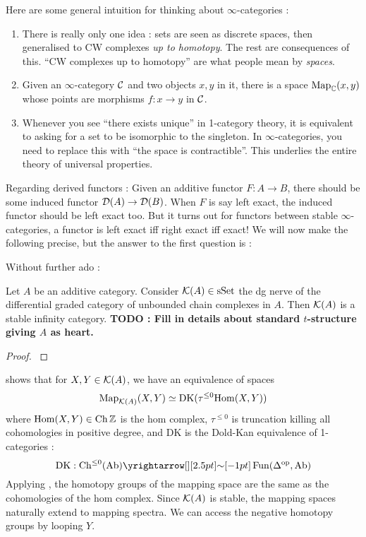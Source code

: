 \documentclass{article}
\begin{document}
Here are some general intuition for thinking about $\infty$-categories : 
\begin{enumerate}
  \item There is really only one idea : 
  sets are seen as discrete spaces,
  then generalised to CW complexes \emph{up to homotopy}.
  The rest are consequences of this.
  ``CW complexes up to homotopy'' are what people
  mean by \emph{spaces}.
  \item Given an $\infty$-category $\mathcal{C}$ and two objects $x , y$ in it,
  there is a space $\mathrm{Map}_{\mathbb{C}}(x , y)$ whose points are morphisms 
  $f : x \to y$ in $\mathcal{C}$.
  \item Whenever you see ``there exists unique'' in 1-category theory,
  it is equivalent to asking for a set to be isomorphic to the singleton.
  In $\infty$-categories, you need to replace
  this with ``the space is contractible''.
  This underlies the entire theory of universal properties.
\end{enumerate}
Regarding derived functors : 
Given an additive functor $F : A \to B$,
there should be some induced functor $\mathcal{D}(A) \to \mathcal{D}(B)$.
When $F$ is say left exact, 
the induced functor should be left exact too.
But it turns out for functors between stable $\infty$-categories,
a functor is left exact iff right exact iff exact!
\cite[Prop. 1.1.4.1]{lurie-HA}
We will now make the following precise, but the answer to the first question is :
\begin{center}
\end{center}
Without further ado :
\begin{prop}

  Let $A$ be an additive category.
  Consider $\mathcal{K}(A) \in \operatorname{sSet}$ 
  the dg nerve of the differential graded
  category of unbounded chain complexes in $A$.
  Then $\mathcal{K}(A)$ is a stable infinity category.
  \textbf{TODO : Fill in details about standard $t$-structure
  giving $A$ as heart.}
\end{prop}
\begin{proof}
  \cite[Prop. 1.3.2.10]{lurie-HA}
\end{proof}
\cite[Remark 1.3.1.12]{lurie-HA}
shows that for $X , Y \in \mathcal{K}(A)$,
we have an equivalence of spaces \[
  \mathrm{Map}_{\mathcal{K}(A)}(X , Y) \simeq \mathrm{DK}(\tau^{\leq 0} {\mathrm{Hom}}(X, Y))
\]
where $\mathrm{Hom}(X , Y) \in \mathrm{Ch}\,\mathbb{Z}$ is the hom complex,
$\tau^{\leq 0}$ is truncation killing all cohomologies in positive degree, 
and $\mathrm{DK}$ is the Dold-Kan equivalence
of 1-categories : \[
  \mathrm{DK} : \CH^{\leq 0}(\AB) \map{\sim}{} \FUN(\De^{\OP} , \AB)
\]
Applying \cite[Remark 1.2.3.14]{lurie-HA}, the homotopy groups
of the mapping space are the same as the cohomologies of the hom complex.
Since $\mathcal{K}(A)$ is stable,
the mapping spaces naturally extend to mapping spectra.
We can access the negative homotopy groups by looping $Y$.
  
\end{document}
